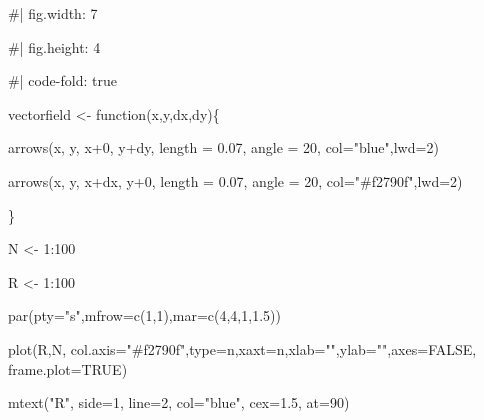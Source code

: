 \documentclass[
  a4paper,
]{scrbook}
\newenvironment{Shaded}{\begin{snugshade}}{\end{snugshade}}
\newcommand{\AttributeTok}[1]{\textcolor[rgb]{0.40,0.45,0.13}{#1}}
\newcommand{\CommentTok}[1]{\textcolor[rgb]{0.37,0.37,0.37}{#1}}
\newcommand{\ConstantTok}[1]{\textcolor[rgb]{0.56,0.35,0.01}{#1}}
\newcommand{\ControlFlowTok}[1]{\textcolor[rgb]{0.00,0.23,0.31}{#1}}
\newcommand{\DecValTok}[1]{\textcolor[rgb]{0.68,0.00,0.00}{#1}}
\newcommand{\FloatTok}[1]{\textcolor[rgb]{0.68,0.00,0.00}{#1}}
\newcommand{\FunctionTok}[1]{\textcolor[rgb]{0.28,0.35,0.67}{#1}}
\newcommand{\NormalTok}[1]{\textcolor[rgb]{0.00,0.23,0.31}{#1}}
\newcommand{\OtherTok}[1]{\textcolor[rgb]{0.00,0.23,0.31}{#1}}
\newcommand{\SpecialCharTok}[1]{\textcolor[rgb]{0.37,0.37,0.37}{#1}}
\newcommand{\StringTok}[1]{\textcolor[rgb]{0.13,0.47,0.30}{#1}}
\theoremstyle{definition}
\theoremstyle{remark}
\begin{document}
\begin{Shaded}
\begin{Highlighting}[]
\CommentTok{\#| fig.width: 7}

\CommentTok{\#| fig.height: 4}

\CommentTok{\#| code{-}fold: true}

\NormalTok{vectorfield }\OtherTok{\textless{}{-}} \ControlFlowTok{function}\NormalTok{(x,y,dx,dy)\{}

  \FunctionTok{arrows}\NormalTok{(x, y, x}\SpecialCharTok{+}\DecValTok{0}\NormalTok{, y}\SpecialCharTok{+}\NormalTok{dy, }\AttributeTok{length =} \FloatTok{0.07}\NormalTok{, }\AttributeTok{angle =} \DecValTok{20}\NormalTok{, }\AttributeTok{col=}\StringTok{"blue"}\NormalTok{,}\AttributeTok{lwd=}\DecValTok{2}\NormalTok{)}

  \FunctionTok{arrows}\NormalTok{(x, y, x}\SpecialCharTok{+}\NormalTok{dx, y}\SpecialCharTok{+}\DecValTok{0}\NormalTok{, }\AttributeTok{length =} \FloatTok{0.07}\NormalTok{, }\AttributeTok{angle =} \DecValTok{20}\NormalTok{, }\AttributeTok{col=}\StringTok{"\#f2790f"}\NormalTok{,}\AttributeTok{lwd=}\DecValTok{2}\NormalTok{)}

\NormalTok{\}}

\NormalTok{N }\OtherTok{\textless{}{-}} \DecValTok{1}\SpecialCharTok{:}\DecValTok{100}

\NormalTok{R }\OtherTok{\textless{}{-}} \DecValTok{1}\SpecialCharTok{:}\DecValTok{100}

\FunctionTok{par}\NormalTok{(}\AttributeTok{pty=}\StringTok{"s"}\NormalTok{,}\AttributeTok{mfrow=}\FunctionTok{c}\NormalTok{(}\DecValTok{1}\NormalTok{,}\DecValTok{1}\NormalTok{),}\AttributeTok{mar=}\FunctionTok{c}\NormalTok{(}\DecValTok{4}\NormalTok{,}\DecValTok{4}\NormalTok{,}\DecValTok{1}\NormalTok{,}\FloatTok{1.5}\NormalTok{))}

\FunctionTok{plot}\NormalTok{(R,N,  }\AttributeTok{col.axis=}\StringTok{"\#f2790f"}\NormalTok{,}\AttributeTok{type=}\StringTok{\textquotesingle{}n\textquotesingle{}}\NormalTok{,}\AttributeTok{xaxt=}\StringTok{\textquotesingle{}n\textquotesingle{}}\NormalTok{,}\AttributeTok{xlab=}\StringTok{""}\NormalTok{,}\AttributeTok{ylab=}\StringTok{""}\NormalTok{,}\AttributeTok{axes=}\ConstantTok{FALSE}\NormalTok{, }\AttributeTok{frame.plot=}\ConstantTok{TRUE}\NormalTok{)}

\FunctionTok{mtext}\NormalTok{(}\StringTok{"R"}\NormalTok{, }\AttributeTok{side=}\DecValTok{1}\NormalTok{, }\AttributeTok{line=}\DecValTok{2}\NormalTok{, }\AttributeTok{col=}\StringTok{"blue"}\NormalTok{, }\AttributeTok{cex=}\FloatTok{1.5}\NormalTok{, }\AttributeTok{at=}\DecValTok{90}\NormalTok{)}


\end{Highlighting}
\end{Shaded}
\end{document}
